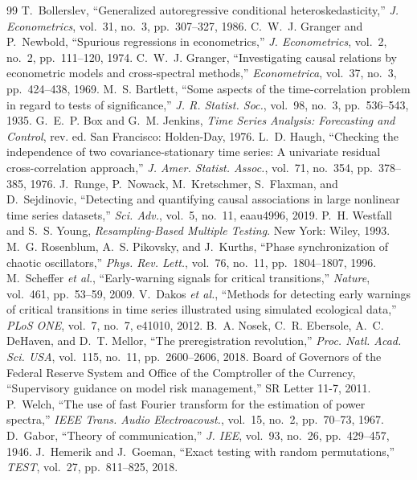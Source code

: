 \documentclass[10pt,twocolumn,letterpaper]{article}
\theoremstyle{definition}
\theoremstyle{remark}
\begin{document}
\begin{thebibliography}{99}
 T.~Bollerslev, ``Generalized autoregressive conditional heteroskedasticity,'' \emph{J. Econometrics}, vol.~31, no.~3, pp.~307--327, 1986.
 C.~W.~J. Granger and P.~Newbold, ``Spurious regressions in econometrics,'' \emph{J. Econometrics}, vol.~2, no.~2, pp.~111--120, 1974.
 C.~W.~J. Granger, ``Investigating causal relations by econometric models and cross-spectral methods,'' \emph{Econometrica}, vol.~37, no.~3, pp.~424--438, 1969.
 M.~S. Bartlett, ``Some aspects of the time-correlation problem in regard to tests of significance,'' \emph{J. R. Statist. Soc.}, vol.~98, no.~3, pp.~536--543, 1935.
 G.~E.~P. Box and G.~M. Jenkins, \emph{Time Series Analysis: Forecasting and Control}, rev. ed. San Francisco: Holden-Day, 1976.
 L.~D. Haugh, ``Checking the independence of two covariance-stationary time series: A univariate residual cross-correlation approach,'' \emph{J. Amer. Statist. Assoc.}, vol.~71, no.~354, pp.~378--385, 1976.
 J.~Runge, P.~Nowack, M.~Kretschmer, S.~Flaxman, and D.~Sejdinovic, ``Detecting and quantifying causal associations in large nonlinear time series datasets,'' \emph{Sci. Adv.}, vol.~5, no.~11, eaau4996, 2019.
 P.~H. Westfall and S.~S. Young, \emph{Resampling-Based Multiple Testing}. New York: Wiley, 1993.
 M.~G. Rosenblum, A.~S. Pikovsky, and J.~Kurths, ``Phase synchronization of chaotic oscillators,'' \emph{Phys. Rev. Lett.}, vol.~76, no.~11, pp.~1804--1807, 1996.
 M.~Scheffer \emph{et al.}, ``Early-warning signals for critical transitions,'' \emph{Nature}, vol.~461, pp.~53--59, 2009.
 V.~Dakos \emph{et al.}, ``Methods for detecting early warnings of critical transitions in time series illustrated using simulated ecological data,'' \emph{PLoS ONE}, vol.~7, no.~7, e41010, 2012.
 B.~A. Nosek, C.~R. Ebersole, A.~C. DeHaven, and D.~T. Mellor, ``The preregistration revolution,'' \emph{Proc. Natl. Acad. Sci. USA}, vol.~115, no.~11, pp.~2600--2606, 2018.
 Board of Governors of the Federal Reserve System and Office of the Comptroller of the Currency, ``Supervisory guidance on model risk management,'' SR Letter 11-7, 2011.
 P.~Welch, ``The use of fast Fourier transform for the estimation of power spectra,'' \emph{IEEE Trans. Audio Electroacoust.}, vol.~15, no.~2, pp.~70--73, 1967.
 D.~Gabor, ``Theory of communication,'' \emph{J. IEE}, vol.~93, no.~26, pp.~429--457, 1946.
 J.~Hemerik and J.~Goeman, ``Exact testing with random permutations,'' \emph{TEST}, vol.~27, pp.~811--825, 2018.

\end{thebibliography}
\end{document}
